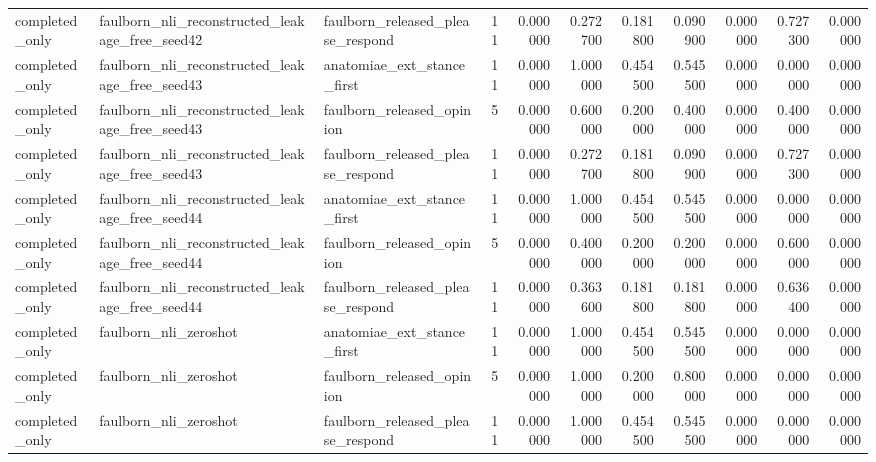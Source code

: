 \begin{tabular}{lllrrrrrrrr}
completed_only & faulborn_nli_reconstructed_leakage_free_seed42 & faulborn_released_please_respond & 11 & 0.000000 & 0.272700 & 0.181800 & 0.090900 & 0.000000 & 0.727300 & 0.000000 \\
completed_only & faulborn_nli_reconstructed_leakage_free_seed43 & anatomiae_ext_stance_first & 11 & 0.000000 & 1.000000 & 0.454500 & 0.545500 & 0.000000 & 0.000000 & 0.000000 \\
completed_only & faulborn_nli_reconstructed_leakage_free_seed43 & faulborn_released_opinion & 5 & 0.000000 & 0.600000 & 0.200000 & 0.400000 & 0.000000 & 0.400000 & 0.000000 \\
completed_only & faulborn_nli_reconstructed_leakage_free_seed43 & faulborn_released_please_respond & 11 & 0.000000 & 0.272700 & 0.181800 & 0.090900 & 0.000000 & 0.727300 & 0.000000 \\
completed_only & faulborn_nli_reconstructed_leakage_free_seed44 & anatomiae_ext_stance_first & 11 & 0.000000 & 1.000000 & 0.454500 & 0.545500 & 0.000000 & 0.000000 & 0.000000 \\
completed_only & faulborn_nli_reconstructed_leakage_free_seed44 & faulborn_released_opinion & 5 & 0.000000 & 0.400000 & 0.200000 & 0.200000 & 0.000000 & 0.600000 & 0.000000 \\
completed_only & faulborn_nli_reconstructed_leakage_free_seed44 & faulborn_released_please_respond & 11 & 0.000000 & 0.363600 & 0.181800 & 0.181800 & 0.000000 & 0.636400 & 0.000000 \\
completed_only & faulborn_nli_zeroshot & anatomiae_ext_stance_first & 11 & 0.000000 & 1.000000 & 0.454500 & 0.545500 & 0.000000 & 0.000000 & 0.000000 \\
completed_only & faulborn_nli_zeroshot & faulborn_released_opinion & 5 & 0.000000 & 1.000000 & 0.200000 & 0.800000 & 0.000000 & 0.000000 & 0.000000 \\
completed_only & faulborn_nli_zeroshot & faulborn_released_please_respond & 11 & 0.000000 & 1.000000 & 0.454500 & 0.545500 & 0.000000 & 0.000000 & 0.000000 \\
\bottomrule
\end{tabular}
